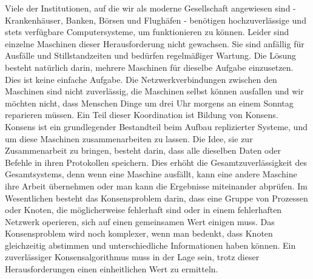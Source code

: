 Viele der Institutionen, auf die wir als moderne Gesellschaft angewiesen sind - Krankenhäuser, Banken, Börsen und Flughäfen - benötigen hochzuverlässige und stets verfügbare Computersysteme, um funktionieren zu können. Leider sind einzelne Maschinen dieser Herausforderung nicht gewachsen. Sie sind anfällig für Ausfälle und Stillstandzeiten und bedürfen regelmäßiger Wartung. Die Lösung besteht natürlich darin, mehrere Maschinen für dieselbe Aufgabe einzusetzen. 
Dies ist keine einfache Aufgabe. Die Netzwerkverbindungen zwischen den Maschinen sind nicht zuverlässig, die Maschinen selbst können ausfallen und wir möchten nicht, dass Menschen Dinge um drei Uhr morgens an einem Sonntag reparieren müssen. Ein Teil dieser Koordination ist Bildung von Konsens. Konsens ist ein grundlegender Bestandteil beim Aufbau replizierter Systeme, und um diese Maschinen zusammenarbeiten zu lassen. Die Idee, sie zur Zusammenarbeit zu bringen, besteht darin, dass alle dieselben Daten oder Befehle in ihren Protokollen speichern. Dies erhöht die Gesamtzuverlässigkeit des Gesamtsystems, denn wenn eine Maschine ausfällt, kann eine andere Maschine ihre Arbeit übernehmen oder man kann die Ergebnisse miteinander abprüfen.
Im Wesentlichen besteht das Konsensproblem darin, dass eine Gruppe von Prozessen oder Knoten, die möglicherweise fehlerhaft sind oder in einem fehlerhaften Netzwerk operieren, sich auf einen gemeinsamen Wert einigen muss. Das Konsensproblem wird noch komplexer, wenn man bedenkt, dass Knoten gleichzeitig abstimmen und unterschiedliche Informationen haben können. Ein zuverlässiger Konsensalgorithmus muss in der Lage sein, trotz dieser Herausforderungen einen einheitlichen Wert zu ermitteln.
